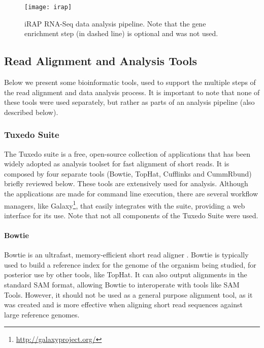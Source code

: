 \begin{figure}[!htb]
  \begin{center}
    \leavevmode
    \texttt{[image: irap]}
    \caption[iRAP RNA-Seq data analysis pipeline]{
      iRAP RNA-Seq data analysis pipeline. Note that the gene enrichment step
      (in dashed line) is optional and was not used.
    }
    \label{fig:irap}
  \end{center}
\end{figure}

\subsection{\rnaseq{} Read Alignment and Analysis Tools}

Below we present some bioinformatic tools, used to support the multiple steps of
the \rnaseq{} read alignment and data analysis process. It is important to note that none of these
tools were used separately, but rather as parts of an analysis pipeline (also
described below).

\subsubsection*{Tuxedo Suite}

The Tuxedo suite is a free, open-source collection of applications that has been
widely adopted as analysis toolset for fast alignment of short reads. It is
composed by four separate tools (Bowtie, TopHat, Cufflinks and CummRbund)
briefly reviewed below. These tools are extensively used for \rnaseq{} analysis.
Although the applications are made for command line execution, there are several
workflow managers, like Galaxy\footnote{\url{http://galaxyproject.org/}}, that
easily integrates with the suite, providing a web interface for its use. Note
that not all components of the Tuxedo Suite were used.

\paragraph{Bowtie}

Bowtie is an ultrafast, memory-efficient short read aligner
\cite{langmead2009ultrafast}. Bowtie is typically used to build a reference
index for the genome of the organism being studied, for posterior use by other
tools, like TopHat. It can also output alignments in the standard SAM format,
allowing Bowtie to interoperate with tools like SAM Tools. However, it should
not be used as a general purpose alignment tool, as it was created and is more
effective when aligning short read sequences against large reference genomes.

